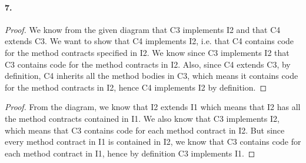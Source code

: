 \documentclass[10pt]{article}
\begin{document}
\paragraph{7. } 
\begin{proof}
We know from the given diagram that C3 implements I2 and that C4 extends C3. We want to show that C4 implements I2, i.e. that C4 contains code for the method contracts specified in I2. We know since C3 implements I2 that C3 contains code for the method contracts in I2. Also, since C4 extends C3, by definition, C4 inherits all the method bodies in C3, which means it contains code for the method contracts in I2, hence C4 implements I2 by definition. 
\end{proof}

\begin{proof}
From the diagram, we know that I2 extends I1 which means that I2 has all the method contracts contained in I1. We also know that C3 implements I2, which means that C3 contains code for each method contract in I2. But since every method contract in I1 is contained in I2, we know that C3 contains code for each method contract in I1, hence by definition C3 implements I1. 
\end{proof}
\end{document}
